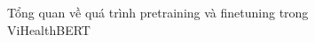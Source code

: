 \begin{figure}
\begin{center}
\caption{Tổng quan về quá trình pretraining và finetuning trong ViHealthBERT\cite{minh-EtAl:2022:LREC}}
\end{center}
\end{figure}